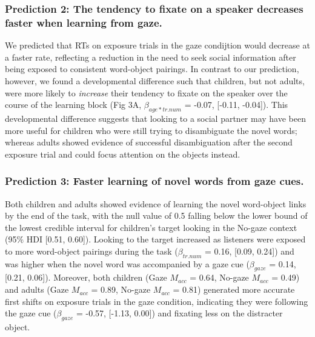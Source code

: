 \documentclass[10pt, letterpaper]{article}
\begin{document}
\hypertarget{prediction-2-the-tendency-to-fixate-on-a-speaker-decreases-faster-when-learning-from-gaze.}{%
\subsubsection{Prediction 2: The tendency to fixate on a speaker
decreases faster when learning from
gaze.}\label{prediction-2-the-tendency-to-fixate-on-a-speaker-decreases-faster-when-learning-from-gaze.}}

We predicted that RTs on exposure trials in the gaze condijtion would
decrease at a faster rate, reflecting a reduction in the need to seek
social information after being exposed to consistent word-object
pairings. In contrast to our prediction, however, we found a
developmental difference such that children, but not adults, were more
likely to \emph{increase} their tendency to fixate on the speaker over
the course of the learning block (Fig 3A, \(\beta_{age*tr.num}\) =
-0.07, {[}-0.11, -0.04{]}). This developmental difference suggests that
looking to a social partner may have been more useful for children who
were still trying to disambiguate the novel words; whereas adults showed
evidence of successful disambiguation after the second exposure trial
and could focus attention on the objects instead.

\hypertarget{prediction-3-faster-learning-of-novel-words-from-gaze-cues.}{%
\subsubsection{Prediction 3: Faster learning of novel words from gaze
cues.}\label{prediction-3-faster-learning-of-novel-words-from-gaze-cues.}}

Both children and adults showed evidence of learning the novel
word-object links by the end of the task, with the null value of 0.5
falling below the lower bound of the lowest credible interval for
children's target looking in the No-gaze context (95\% HDI {[}0.51,
0.60{]}). Looking to the target increased as listeners were exposed to
more word-object pairings during the task (\(\beta_{tr.num}\) = 0.16,
{[}0.09, 0.24{]}) and was higher when the novel word was accompanied by
a gaze cue (\(\beta_{gaze}\) = 0.14, {[}0.21, 0.06{]}). Moreover, both
children (Gaze \(M_{acc}\) = 0.64, No-gaze \(M_{acc}\) = 0.49) and
adults (Gaze \(M_{acc}\) = 0.89, No-gaze \(M_{acc}\) = 0.81) generated
more accurate first shifts on exposure trials in the gaze condition,
indicating they were following the gaze cue (\(\beta_{gaze}\) = -0.57,
{[}-1.13, 0.00{]}) and fixating less on the distracter object.
\end{document}
